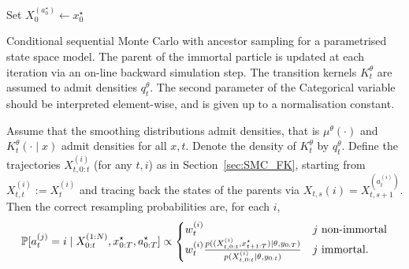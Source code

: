 \begin{algorithm}[ht]
\vspace*{10pt}
\DontPrintSemicolon
{}
Set $X_0^{(a_0^\star)} \gets x_0^\star$\;
\vspace*{10pt}
\caption[Conditional sequential Monte Carlo with ancestor sampling]{Conditional sequential Monte Carlo with ancestor sampling for a parametrised state space model. The parent of the immortal particle is updated at each iteration via an on-line backward simulation step. The transition kernels $K_t^\theta$ are assumed to admit densities $q_t^\theta$. The second parameter of the Categorical variable should be interpreted element-wise, and is given up to a normalisation constant.}
\label{alg:condSMC_ancsamp}
\end{algorithm}
Assume that the smoothing distributions admit densities, that is $\mu^\theta(\cdot)$ and $K_t^\theta(\cdot\mid x)$ admit densities for all $x,t$. Denote the density of $K_t^\theta$ by $q_t^\theta$. Define the trajectories $X_{t, 0:t}^{(i)}$ (for any $t,i$) as in Section~\ref{sec:SMC_FK}, starting from $X_{t,t}^{(i)} := X_t^{(i)}$ and tracing back the states of the parents via $X_{t,s}{(i)} = X_{t,s+1}^{( a_t^{(i)} )}$.
Then the correct resampling probabilities are, for each $i$,
\begin{equation}\label{eq:ancsamp_probs}
\mathbb{P}[a_t^{(j)} = i \mid X_{0:t}^{(1:N)}, x_{0:T}^\star, a_{0:T}^\star ] 
\propto \begin{cases}
w_t^{(i)} & j \text{ non-immortal}\\
w_t^{(i)} \frac{
        p( (X_{t,0:t}^{(i)}, x_{t+1:T}^\star) \mid \theta, y_{0:T} )}
        {p( X_{t,0:t}^{(i)} \mid \theta, y_{0:t} ) } 
        & j \text{ immortal} .
\end{cases}
\end{equation}
